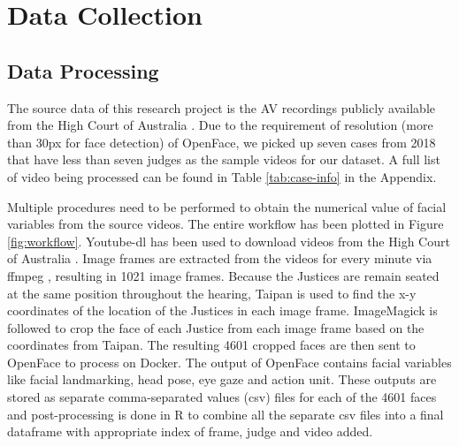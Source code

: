 \documentclass{monashthesis}
\begin{document}
\hypertarget{data-collection}{%
\chapter{Data Collection}\label{data-collection}}

\hypertarget{data-processing}{%
\section{Data Processing}\label{data-processing}}

The source data of this research project is the AV recordings publicly available from the High Court of Australia \autocite{highcourtau}. Due to the requirement of resolution (more than 30px for face detection) of OpenFace, we picked up seven cases from 2018 that have less than seven judges as the sample videos for our dataset. A full list of video being processed can be found in Table \ref{tab:case-info} in the Appendix.

Multiple procedures need to be performed to obtain the numerical value of facial variables from the source videos. The entire workflow has been plotted in Figure \ref{fig:workflow}. Youtube-dl \autocite{youtube-dl} has been used to download videos from the High Court of Australia \autocite{highcourtau}. Image frames are extracted from the videos for every minute via ffmpeg \autocite{ffmpeg}, resulting in 1021 image frames. Because the Justices are remain seated at the same position throughout the hearing, Taipan \autocite{Taipan} is used to find the x-y coordinates of the location of the Justices in each image frame. ImageMagick \autocite{ImageMagick} is followed to crop the face of each Justice from each image frame based on the coordinates from Taipan. The resulting 4601 cropped faces are then sent to OpenFace \autocite{baltrusaitis2018openface} to process on Docker. The output of OpenFace contains facial variables like facial landmarking, head pose, eye gaze and action unit. These outputs are stored as separate comma-separated values (csv) files for each of the 4601 faces and post-processing is done in R to combine all the separate csv files into a final dataframe with appropriate index of frame, judge and video added.
\end{document}
